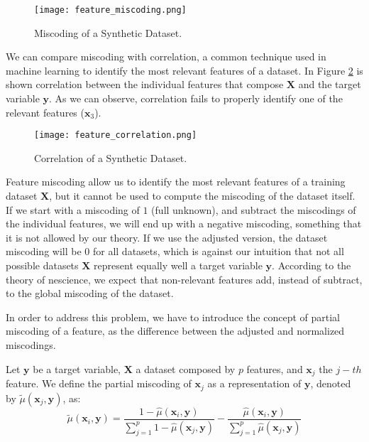 \begin{example}
\begin{figure}[h]
\centering
\texttt{[image: feature\_miscoding.png]}
\caption{Miscoding of a Synthetic Dataset.}
\label{figure:miscoding_make_classification}
\end{figure}

We can compare miscoding with correlation, a common technique used in machine learning to identify the most relevant features of a dataset. In Figure \ref{figure:correlation_make_classification} is shown correlation between the individual features that compose $\mathbf{X}$ and the target variable $\mathbf{y}$. As we can observe, correlation fails to properly identify one of the relevant features ($\mathbf{x}_3$).

\begin{figure}[h]
\centering
\texttt{[image: feature\_correlation.png]}
\caption{Correlation of a Synthetic Dataset.}
\label{figure:correlation_make_classification}
\end{figure}

\end{example}

Feature miscoding allow us to identify the most relevant features of a training dataset $\mathbf{X}$, but it cannot be used to compute the miscoding of the dataset itself. If we start with a miscoding of $1$ (full unknown), and subtract the miscodings of the individual features, we will end up with a negative miscoding, something that it is not allowed by our theory. If we use the adjusted version, the dataset miscoding will be $0$ for all datasets, which is against our intuition that not all possible datasets $\mathbf{X}$ represent equally well a target variable $\mathbf{y}$. According to the theory of nescience, we expect that non-relevant features add, instead of subtract, to the global miscoding of the dataset.

In order to address this problem, we have to introduce the concept of partial miscoding of a feature, as the difference between the adjusted and normalized miscodings.

\begin{definition}
Let $\mathbf{y}$ be a target variable, $\mathbf{X}$ a dataset composed by $p$ features, and $\mathbf{x}_j$ the $j-th$ feature. We define the partial miscoding of $\mathbf{x}_j$ as a representation of $\mathbf{y}$, denoted by $\tilde\mu(\mathbf{x}_j, \mathbf{y})$, as:
\[
\tilde\mu(\mathbf{x}_i, \mathbf{y}) = \frac{ 1 - \hat\mu(\mathbf{x}_i, \mathbf{y}) } { \sum_{j=1}^p 1 - \hat\mu(\mathbf{x}_j, \mathbf{y}) } - \frac{\hat\mu(\mathbf{x}_i, \mathbf{y}) } { \sum_{j=1}^p \hat\mu(\mathbf{x}_j, \mathbf{y}) }
\]
\end{definition}

